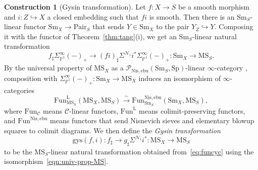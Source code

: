 \documentclass{amsart}
\numberwithin{equation}{section}
\theoremstyle{plain}
\theoremstyle{definition}
\newtheorem{construction}[equation]{Construction}
\let\scr=\mathcal
\let\bb=\mathbb
\def\P{\bb P}
\def\ph{\mathord-}
\let\into=\hookrightarrow
\def\simto{\xrightarrow{\sim}}
\def\Nis{\mathrm{Nis}}
\let\cat=\mathrm
\def\Sm{{\cat{S}\mathrm{m}}}
\def\Pair{\mathrm{Pair}}
\def\MS{\mathrm{MS}}
\def\Sp{\mathrm{Sp}}
\def\Fun{\mathrm{Fun}}
\def\ebu{\mathrm{ebu}}
\begin{document}
\begin{construction}[Gysin transformation]
	\label{ctr:gysin}
	Let $f\colon X\to S$ be a smooth morphism and $i\colon Z\into X$ a closed embedding such that $fi$ is smooth.
	Then there is an $\Sm_S$-linear functor $\Sm_X \to \Pair_S$ that sends $Y \in \Sm_X$ to the pair $Y_Z \into Y$. Composing it with the functor of Theorem~\ref{thm:tang}(i), we get an $\Sm_S$-linear natural transformation
\begin{equation}\label{eq:funcyc}
f_\sharp\Sigma^\infty_{\P^1}(\ph)_+ \to (fi)_\sharp \Sigma^{\scr N_i} i^*\Sigma^\infty_{\P^1}(\ph)_+\colon \Sm_X \to \MS_S.
\end{equation}
By the universal property of $\MS_X$ as a $\scr P_{\Nis, \ebu}(\Sm_S,\Sp)$-linear $\infty$-category \cite[Proposition 1.2.2]{AnnalaIwasa2}, composition with $\Sigma^\infty_{\P^1}(\ph)_+\colon \Sm_X\to \MS_X$ induces an isomorphism of $\infty$-categories
\begin{equation}\label{eqn:univ-prop-MS}
\Fun_{\MS_S}^\mathrm{L}(\MS_X,\MS_S) \simto \Fun_{\Sm_S}^{\Nis,\ebu}(\Sm_X,\MS_S),
\end{equation}
where $\Fun_{\scr C}$ means $\scr C$-linear functors, $\Fun^\mathrm{L}$ means colimit-preserving functors, and $\Fun^{\Nis,\ebu}$ means functors that send Nisnevich sieves and elementary blowup squares to colimit diagrams.
We then define the \emph{Gysin transformation} 
\begin{equation*}
\mathrm{gys}(f,i)\colon f_\sharp \to g_\sharp \Sigma^{\scr N_i} i^*\colon \MS_X\to\MS_S
\end{equation*}
to be the $\MS_S$-linear natural transformation obtained from~\eqref{eq:funcyc} using the isomorphism~\eqref{eqn:univ-prop-MS}.
\end{construction}
\end{document}
